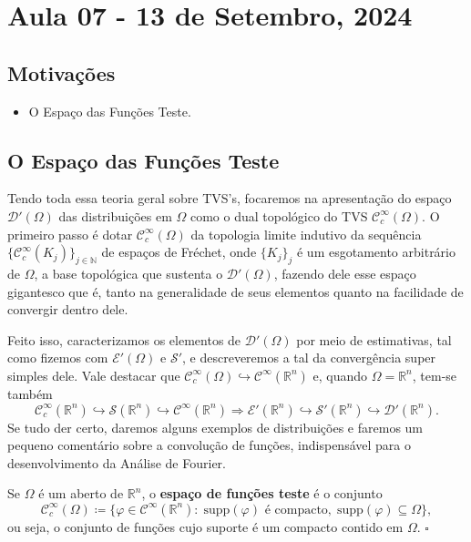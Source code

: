\documentclass[../distribution_theory_notes.tex]{subfiles}
\begin{document}
\section{Aula 07 - 13 de Setembro, 2024}
\subsection{Motivações}
\begin{itemize}
 \item O Espaço das Funções Teste.
\end{itemize}
\subsection{O Espaço das Funções Teste}
Tendo toda essa teoria geral sobre TVS's, focaremos na apresentação do espaço \(\mathcal{D}'(\Omega )\) das distribuições em \(\Omega \) como o dual topológico do TVS \(\mathcal{C}_{c}^{\infty}(\Omega ).\) O primeiro passo é dotar \(\mathcal{C}_{c}^{\infty}(\Omega )\) da topologia limite indutivo da sequência \(\{\mathcal{C}_{c}^{\infty}(K_{j})\}_{j\in \mathbb{N}}\) de espaços de Fréchet, onde \(\{K_{j}\}_{j}\) é um esgotamento arbitrário de \(\Omega \), a base topológica que sustenta o \(\mathcal{D}'(\Omega )\), fazendo dele esse espaço gigantesco que é, tanto na generalidade de seus elementos quanto na facilidade de convergir dentro dele.

Feito isso, caracterizamos os elementos de \(\mathcal{D}'(\Omega )\) por meio de estimativas, tal como fizemos com \(\mathcal{E}'(\Omega )\) e \(\mathcal{S}'\), e descreveremos a tal da convergência super simples dele. Vale destacar que \(\mathcal{C}_{c}^{\infty}(\Omega )\hookrightarrow \mathcal{C}^{\infty}(\mathbb{R}^{n})\) e, quando \(\Omega =\mathbb{R}^{n}\), tem-se também 
  \[
    \mathcal{C}_{c}^{\infty}(\mathbb{R}^{n})\hookrightarrow \mathcal{S}(\mathbb{R}^{n})\hookrightarrow \mathcal{C}^{\infty}(\mathbb{R}^{n}) \Rightarrow \mathcal{E}'(\mathbb{R}^{n})\hookrightarrow \mathcal{S}'(\mathbb{R}^{n})\hookrightarrow \mathcal{D}'(\mathbb{R}^{n}). 
  \]
Se tudo der certo, daremos alguns exemplos de distribuições e faremos um pequeno comentário sobre a convolução de funções, indispensável para o desenvolvimento da Análise de Fourier.

\begin{def*}
  Se \(\Omega \) é um aberto de \(\mathbb{R}^{n}\), o \textbf{espaço de funções teste} é o conjunto 
    \[
      \mathcal{C}_{c}^{\infty}(\Omega )\coloneqq \{\varphi \in \mathcal{C}^{\infty}(\mathbb{R}^{n}):\; \mathrm{supp}(\varphi )\text{ é compacto},\; \mathrm{supp}(\varphi )\subseteq \Omega \},
    \]
    ou seja, o conjunto de funções cujo suporte é um compacto contido em \(\Omega \). \(\square\)
\end{def*}
  
\end{document}
